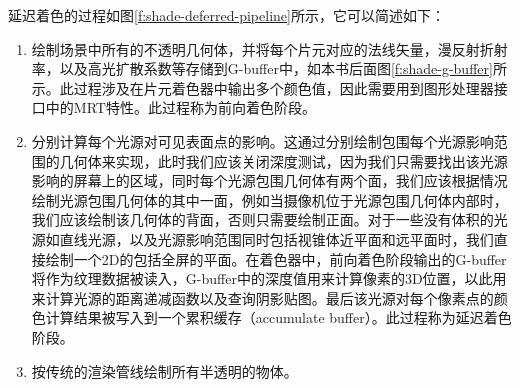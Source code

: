 延迟着色的过程如图\ref{f:shade-deferred-pipeline}所示，它可以简述如下：

\begin{enumerate}
	\item 绘制场景中所有的不透明几何体，并将每个片元对应的法线矢量，漫反射折射率，以及高光扩散系数等存储到G-buffer中，如本书后面图\ref{f:shade-g-buffer}所示。此过程涉及在片元着色器中输出多个颜色值，因此需要用到图形处理器接口中的MRT特性。此过程称为前向着色阶段。
	\item 分别计算每个光源对可见表面点的影响。这通过分别绘制包围每个光源影响范围的几何体来实现，此时我们应该关闭深度测试，因为我们只需要找出该光源影响的屏幕上的区域，同时每个光源包围几何体有两个面，我们应该根据情况绘制光源包围几何体的其中一面，例如当摄像机位于光源包围几何体内部时，我们应该绘制该几何体的背面，否则只需要绘制正面。对于一些没有体积的光源如直线光源，以及光源影响范围同时包括视锥体近平面和远平面时，我们直接绘制一个2D的包括全屏的平面。在着色器中，前向着色阶段输出的G-buffer将作为纹理数据被读入，G-buffer中的深度值用来计算像素的3D位置，以此用来计算光源的距离递减函数以及查询阴影贴图。最后该光源对每个像素点的颜色计算结果被写入到一个累积缓存（accumulate buffer）。此过程称为延迟着色阶段。
	\item 按传统的渲染管线绘制所有半透明的物体。
\end{enumerate}

